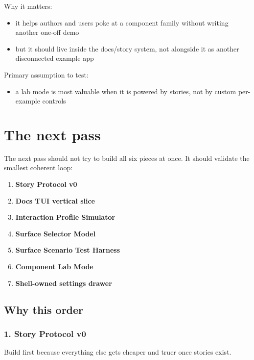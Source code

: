 Why it matters:

\begin{itemize}
\tightlist
\item
  it helps authors and users poke at a component family without writing another one-off demo
\item
  but it should live inside the docs/story system, not alongside it as another disconnected example app
\end{itemize}

Primary assumption to test:

\begin{itemize}
\tightlist
\item
  a lab mode is most valuable when it is powered by stories, not by custom per-example controls
\end{itemize}

\section{The next pass}\label{record-042-the-next-pass}

The next pass should not try to build all six pieces at once. It should validate the smallest coherent loop:

\begin{enumerate}
\def\labelenumi{\arabic{enumi}.}
\tightlist
\item
  \textbf{Story Protocol v0}
\item
  \textbf{Docs TUI vertical slice}
\item
  \textbf{Interaction Profile Simulator}
\item
  \textbf{Surface Selector Model}
\item
  \textbf{Surface Scenario Test Harness}
\item
  \textbf{Component Lab Mode}
\item
  \textbf{Shell-owned settings drawer}
\end{enumerate}

\subsection{Why this order}\label{record-042-why-this-order}

\subsubsection{1. Story Protocol v0}\label{record-042-story-protocol-v0}

Build first because everything else gets cheaper and truer once stories exist.


